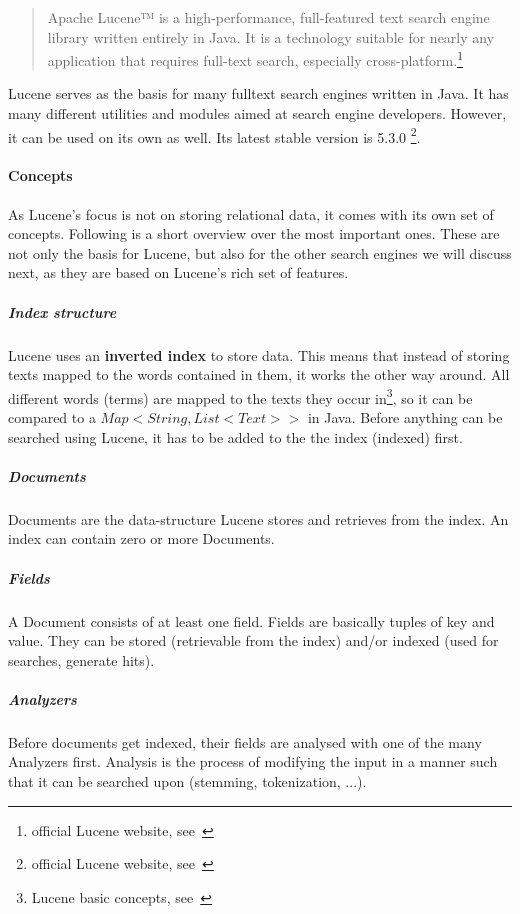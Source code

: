 \begin{quote}
	Apache Lucene™ is a high-performance, full-featured text search engine library written entirely in Java. It is a technology suitable for nearly any application that requires full-text search, especially cross-platform.\footnote{official Lucene website, see~\cite{lucene_apache_org}}
\end{quote}
Lucene serves as the basis for many fulltext search engines written in Java. It has many different utilities and modules aimed at search engine developers. However, it can be used on its own as well. Its latest stable version is 5.3.0 \footnote{official Lucene website, see~\cite{lucene_apache_org}}.

\paragraph{Concepts}

As Lucene's focus is not on storing relational data, it comes with its own set of concepts. Following is a short overview over the most important ones. These are not only the basis for Lucene, but also for the other search engines we will discuss next, as they are based on Lucene's rich set of features.

\subparagraph{Index structure}
Lucene uses an \textbf{inverted index} to store data. This means that instead of storing texts mapped to the words contained in them, it works the other way around. All different words (terms) are mapped to the texts they occur in\footnote{Lucene basic concepts, see~\cite{lucene_basic_concepts}}, so it can be compared to a \(Map<String, List<Text>>\) in Java. Before anything can be searched using Lucene, it has to be added to the the index (indexed) first.

\subparagraph{Documents}
Documents are the data-structure Lucene stores and retrieves from the index. An index can contain zero or more Documents.

\subparagraph{Fields}
A Document consists of at least one field. Fields are basically tuples of key and value. They can be stored (retrievable from the index) and/or indexed (used for searches, generate hits).

\subparagraph{Analyzers}
Before documents get indexed, their fields are analysed with one of the many Analyzers first. Analysis is the process of modifying the input in a manner such that it can be searched upon (stemming, tokenization, ...).

\pagebreak

